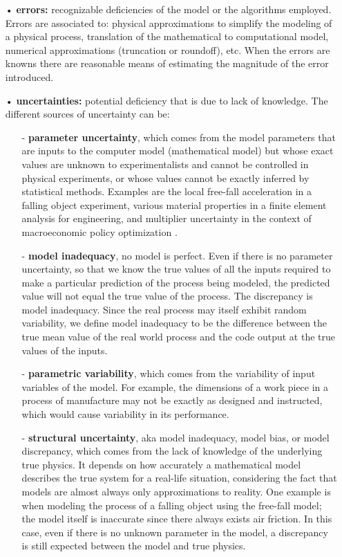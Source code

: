 \begin{itemize}
\item[•] \textbf{errors:} recognizable deficiencies of the model or the algorithms employed. Errors are associated to: physical approximations to simplify the modeling of a physical process, translation of the mathematical to computational model, numerical approximations (truncation or roundoff), etc. When the errors are knowns there are reasonable means of estimating the magnitude of the error introduced. 
\item[•] \textbf{uncertainties:} potential deficiency that is due to lack of knowledge. The different sources of uncertainty can be:
\begin{itemize}
\item[-] \textbf{parameter uncertainty}, which comes from the model parameters that are inputs to the computer model (mathematical model) but whose exact values are unknown to experimentalists and cannot be controlled in physical experiments, or whose values cannot be exactly inferred by statistical methods. Examples are the local free-fall acceleration in a falling object experiment, various material properties in a finite element analysis for engineering, and multiplier uncertainty in the context of macroeconomic policy optimization \cite{Kennedy2001}.
\item[-] \textbf{model inadequacy}, no model is perfect. Even if there is no parameter uncertainty, so that we know the true values of all the inputs required to make a particular prediction of the process being modeled, the predicted value will not equal the true value of the process. The discrepancy is model inadequacy. Since the real process may itself exhibit random variability, we define model inadequacy to be the difference between the true mean value of the real world process and the code output at the true values of the inputs.
\item[-] \textbf{parametric variability}, which comes from the variability of input variables of the model. For example, the dimensions of a work piece in a process of manufacture may not be exactly as designed and instructed, which would cause variability in its performance. 
\item[-] \textbf{structural uncertainty}, aka model inadequacy, model bias, or model discrepancy, which comes from the lack of knowledge of the underlying true physics. It depends on how accurately a mathematical model describes the true system for a real-life situation, considering the fact that models are almost always only approximations to reality. One example is when modeling the process of a falling object using the free-fall model; the model itself is inaccurate since there always exists air friction. In this case, even if there is no unknown parameter in the model, a discrepancy is still expected between the model and true physics. 

\end{itemize}
\end{itemize}
